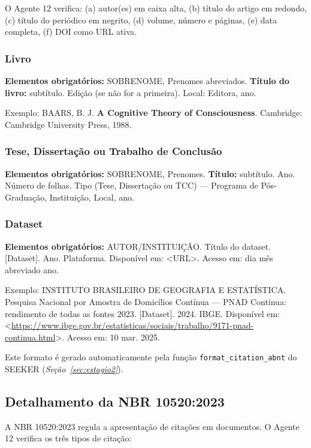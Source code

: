 O Agente 12 verifica: (a) autor(es) em caixa alta, (b) título do
artigo em redondo, (c) título do periódico em negrito, (d) volume,
número e páginas, (e) data completa, (f) DOI como URL ativa.

\subsubsection{Livro}

\textbf{Elementos obrigatórios:} SOBRENOME, Prenomes abreviados.
\textbf{Título do livro:} subtítulo. Edição (se não for a
primeira). Local: Editora, ano.

Exemplo: BAARS, B. J. \textbf{A Cognitive Theory of Consciousness}.
Cambridge: Cambridge University Press, 1988.

\subsubsection{Tese, Dissertação ou Trabalho de Conclusão}

\textbf{Elementos obrigatórios:} SOBRENOME, Prenomes.
\textbf{Título:} subtítulo. Ano. Número de folhas. Tipo (Tese,
Dissertação ou TCC) — Programa de Pós-Graduação, Instituição,
Local, ano.

\subsubsection{Dataset}

\textbf{Elementos obrigatórios:} AUTOR/INSTITUIÇÃO. Título do
dataset. [Dataset]. Ano. Plataforma. Disponível em: <URL>. Acesso
em: dia mês abreviado ano.

Exemplo: INSTITUTO BRASILEIRO DE GEOGRAFIA E ESTATÍSTICA. Pesquisa
Nacional por Amostra de Domicílios Contínua — PNAD Contínua:
rendimento de todas as fontes 2023. [Dataset]. 2024. IBGE.
Disponível em:
<\url{https://www.ibge.gov.br/estatisticas/sociais/trabalho/9171-pnad-continua.html}>.
Acesso em: 10 mar. 2025.

Este formato é gerado automaticamente pela função
\texttt{format\_citation\_abnt} do SEEKER
(\textit{Seção~\ref{sec:estagio2}}).

\subsection{Detalhamento da NBR 10520:2023}
\label{sec:nbr10520_detalhada}

A NBR 10520:2023 \cite{ABNT10520_2023} regula a apresentação de
citações em documentos. O Agente 12 verifica os três tipos de
citação:

